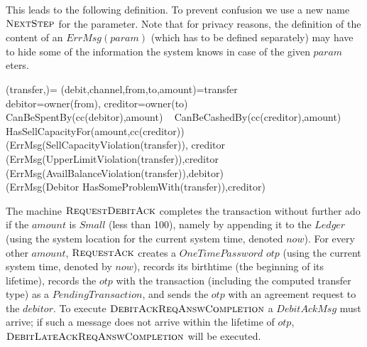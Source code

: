 This leads to the following definition. To prevent confusion we use a new name 
$\hbox{\sc NextStep}$ for the parameter. Note that for privacy reasons, the definition of the content of an $ErrMsg(param)$ (which has to be defined separately) may have to hide some of the information the system knows in case of the given $param$eters.

\begin{asm}
              (transfer,)= \+
              \LET (debit,channel,from,to,amount)=transfer \\
              \LET debitor=owner(from), creditor=owner(to)\\
              \IF CanBeSpentBy(cc(debitor),amount) \+
              \THEN ~ \IF CanBeCashedBy(cc(creditor),amount) \+
              \THEN ~ \IF HasSellCapacityFor(amount,cc(creditor)) \+
              \THEN ~  \-
              \ELSE~
              (ErrMsg(SellCapacityViolation(transfer)),
              \TO creditor\-
              \ELSE~
              (ErrMsg(UpperLimitViolation(transfer)),\TO creditor\-
              \ELSE \+
                 (ErrMsg(AvailBalanceViolation(transfer)),\TO debitor) \\
                 (ErrMsg(Debitor HasSomeProblemWith(transfer)),\TO creditor)
\end{asm}


The machine  $\hbox{\sc RequestDebitAck}$ completes the transaction without further ado if the $amount$ is $Small$ (less than 100), namely by appending it to the $Ledger$ (using the system location for the current system time, denoted $now$). For every other $amount$, $\hbox{\sc RequestAck}$ creates a $OneTimePassword$ $otp$ (using the current system time, denoted by $now$), records its birthtime (the beginning of its lifetime), records the $otp$ with the transaction (including the computed transfer type) as a $PendingTransaction$, and sends the $otp$  with an agreement request to the $debitor$. To execute $\hbox{\sc DebitAckReqAnswCompletion}$ a $DebitAckMsg$ must arrive; if such a message does not arrive within the lifetime of $otp$, $\hbox{\sc DebitLateAckReqAnswCompletion}$ will be 
executed.


